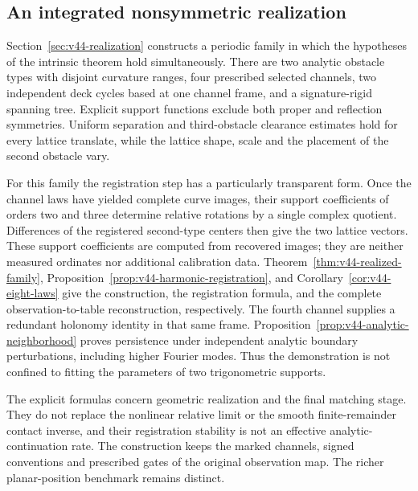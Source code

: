 \subsection{An integrated nonsymmetric realization}

Section~\ref{sec:v44-realization} constructs a periodic family in which the
hypotheses of the intrinsic theorem hold simultaneously.  There are two
analytic obstacle types with disjoint curvature ranges, four prescribed
selected channels, two independent deck cycles based at one channel frame,
and a signature-rigid spanning tree.  Explicit support functions exclude
both proper and reflection symmetries.  Uniform separation and third-obstacle
clearance estimates hold for every lattice translate, while the lattice
shape, scale and the placement of the second obstacle vary.

For this family the registration step has a particularly transparent form.
Once the channel laws have yielded complete curve images, their support
coefficients of orders two and three determine relative rotations by a
single complex quotient.  Differences of the registered second-type
centers then give the two lattice vectors.  These support coefficients
are computed from recovered images; they are neither measured ordinates
nor additional calibration data.  Theorem~\ref{thm:v44-realized-family},
Proposition~\ref{prop:v44-harmonic-registration}, and
Corollary~\ref{cor:v44-eight-laws} give the construction, the registration
formula, and the complete observation-to-table reconstruction, respectively.
The fourth channel supplies a redundant holonomy identity in that same
frame.  Proposition~\ref{prop:v44-analytic-neighborhood} proves persistence
under independent analytic boundary perturbations, including higher
Fourier modes.  Thus the demonstration is not confined to fitting the
parameters of two trigonometric supports.

The explicit formulas concern geometric realization and the final matching
stage.  They do not replace the nonlinear relative limit or the smooth
finite-remainder contact inverse, and their registration stability is not
an effective analytic-continuation rate.  The construction keeps the
marked channels, signed conventions and prescribed gates of the original
observation map.  The richer planar-position benchmark remains distinct.
